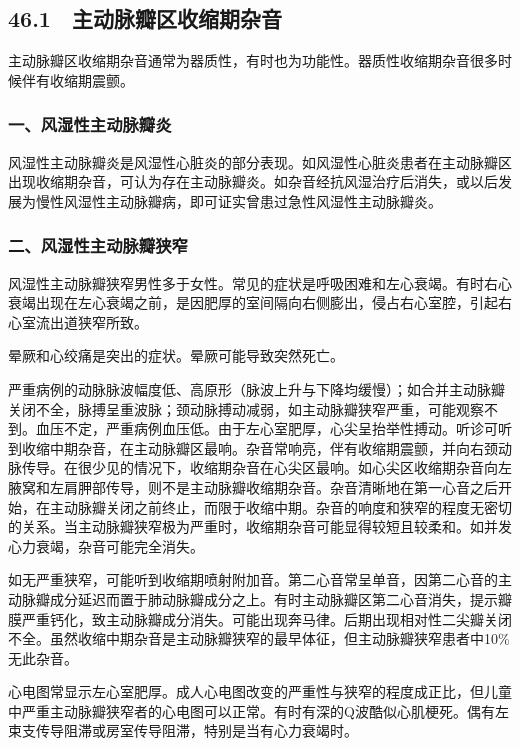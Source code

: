 \subsection{46.1　主动脉瓣区收缩期杂音}

主动脉瓣区收缩期杂音通常为器质性，有时也为功能性。器质性收缩期杂音很多时候伴有收缩期震颤。

\subsubsection{一、风湿性主动脉瓣炎}

风湿性主动脉瓣炎是风湿性心脏炎的部分表现。如风湿性心脏炎患者在主动脉瓣区出现收缩期杂音，可认为存在主动脉瓣炎。如杂音经抗风湿治疗后消失，或以后发展为慢性风湿性主动脉瓣病，即可证实曾患过急性风湿性主动脉瓣炎。

\subsubsection{二、风湿性主动脉瓣狭窄}

风湿性主动脉瓣狭窄男性多于女性。常见的症状是呼吸困难和左心衰竭。有时右心衰竭出现在左心衰竭之前，是因肥厚的室间隔向右侧膨出，侵占右心室腔，引起右心室流出道狭窄所致。

晕厥和心绞痛是突出的症状。晕厥可能导致突然死亡。

严重病例的动脉脉波幅度低、高原形（脉波上升与下降均缓慢）；如合并主动脉瓣关闭不全，脉搏呈重波脉；颈动脉搏动减弱，如主动脉瓣狭窄严重，可能观察不到。血压不定，严重病例血压低。由于左心室肥厚，心尖呈抬举性搏动。听诊可听到收缩中期杂音，在主动脉瓣区最响。杂音常响亮，伴有收缩期震颤，并向右颈动脉传导。在很少见的情况下，收缩期杂音在心尖区最响。如心尖区收缩期杂音向左腋窝和左肩胛部传导，则不是主动脉瓣收缩期杂音。杂音清晰地在第一心音之后开始，在主动脉瓣关闭之前终止，而限于收缩中期。杂音的响度和狭窄的程度无密切的关系。当主动脉瓣狭窄极为严重时，收缩期杂音可能显得较短且较柔和。如并发心力衰竭，杂音可能完全消失。

如无严重狭窄，可能听到收缩期喷射附加音。第二心音常呈单音，因第二心音的主动脉瓣成分延迟而置于肺动脉瓣成分之上。有时主动脉瓣区第二心音消失，提示瓣膜严重钙化，致主动脉瓣成分消失。可能出现奔马律。后期出现相对性二尖瓣关闭不全。虽然收缩中期杂音是主动脉瓣狭窄的最早体征，但主动脉瓣狭窄患者中10\%无此杂音。

心电图常显示左心室肥厚。成人心电图改变的严重性与狭窄的程度成正比，但儿童中严重主动脉瓣狭窄者的心电图可以正常。有时有深的Q波酷似心肌梗死。偶有左束支传导阻滞或房室传导阻滞，特别是当有心力衰竭时。

